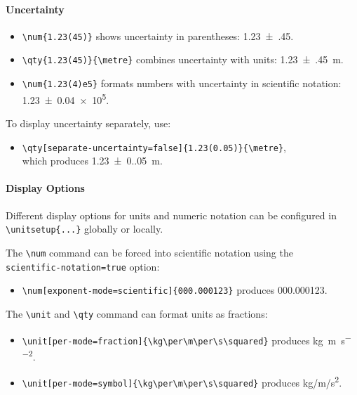     \paragraph*{Uncertainty}
        \begin{itemize}
            \item \verb|\num{1.23(45)}| shows uncertainty in parentheses: \num{1.23(45)}.
            \item \verb|\qty{1.23(45)}{\metre}| combines uncertainty with units: \qty{1.23(45)}{\metre}.
            \item \verb|\num{1.23(4)e5}| formats numbers with uncertainty in scientific notation: \num{1.23(4)e5}.
        \end{itemize}
        To display uncertainty separately, use:
        \begin{itemize}
            \item \verb|\qty[separate-uncertainty=false]{1.23(0.05)}{\metre}|, \\
            which produces \qty[separate-uncertainty=false]{1.23(0.05)}{\metre}.
        \end{itemize}


    \paragraph*{Display Options}
        Different display options for units and numeric notation can be configured in \\
         \verb|\unitsetup{...}| globally or locally.

        The \verb|\num| command can be forced into scientific notation using the\\
        \verb|scientific-notation=true| option:

        \begin{itemize}
            \item \verb|\num[exponent-mode=scientific]{000.000123}| produces \num[exponent-mode=scientific]{000.000123}.
        \end{itemize}

        The \verb|\unit| and \verb|\qty| command can format units as fractions:
        \begin{itemize}
            \item \verb|\unit[per-mode=fraction]{\kg\per\m\per\s\squared}|
               produces \unit[per-mode=fraction]{\kg\per\m\per\s\squared}.
            \item \verb|\unit[per-mode=symbol]{\kg\per\m\per\s\squared}|
               produces \unit[per-mode=symbol]{\kg\per\m\per\s\squared}.
        \end{itemize}


















\endgroup